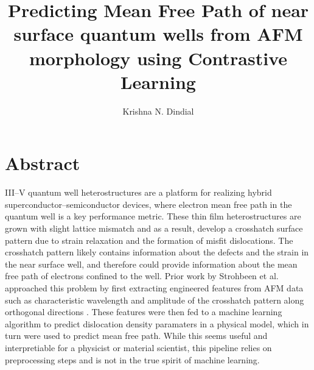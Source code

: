 \documentclass[11pt]{article}
\title{Predicting Mean Free Path of near surface quantum wells from AFM morphology using Contrastive Learning}
\author{Krishna N. Dindial }
\begin{document}
\maketitle

\section{Abstract}

III–V quantum well heterostructures are a platform for realizing hybrid superconductor–semiconductor devices, where electron mean free path in the quantum well is a key performance metric.
These thin film heterostructures are grown with slight lattice mismatch and as a result, develop a crosshatch surface pattern due to strain relaxation and the formation of misfit dislocations.
The crosshatch pattern likely contains information about the defects and the strain in the near surface well, and therefore could provide information about the mean free path of electrons confined to the well.
Prior work by Strohbeen et al. approached this problem by first extracting engineered features from AFM data such as characteristic wavelength and amplitude of the crosshatch pattern along orthogonal directions \cite{strohbeen2024}. These features were then fed to a machine learning algorithm to predict dislocation density paramaters in a physical model, which in turn were used to predict mean free path. 
While this seems 
useful and interpretiable for a physicist or material scientist, this pipeline relies on preprocessing steps and is not in the true spirit of machine learning.
\end{document}
